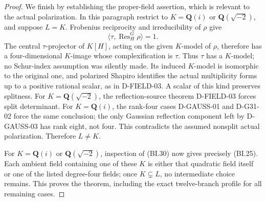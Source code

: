 \begin{proof}
We finish by establishing the proper-field assertion, which is
relevant to the actual polarization.  In this paragraph restrict
to $K=\mathbf Q(i)$ or $\mathbf Q(\sqrt{-2})$, and suppose $L=K$.
Frobenius reciprocity and irreducibility of $\rho$ give
\[
           \langle\tau,\operatorname{Res}_H^G\rho\rangle=1.
\]
The central $\tau$-projector of $K[H]$, acting on the given
$K$-model of $\rho$, therefore has a four-dimensional $K$-image
whose complexification is $\tau$.  Thus $\tau$ has a $K$-model;
no Schur-index assumption was silently made.  Its induced $K$-model
is isomorphic to the original one, and polarized Shapiro identifies
the actual multiplicity forms up to a positive rational scalar,
as in D-FIELD-03.  A scalar of this kind preserves splitness.
For $K=\mathbf Q(\sqrt{-2})$, the reflection-source theorem
D-FIELD-03 forces split determinant.  For $K=\mathbf Q(i)$,
the rank-four cases D-GAUSS-01 and D-G31-02 force the same
conclusion; the only Gaussian reflection component left by
D-GAUSS-03 has rank eight, not four.  This contradicts the
assumed nonsplit actual polarization.  Therefore $L\ne K$.

For $K=\mathbf Q(i)$ or $\mathbf Q(\sqrt{-2})$, inspection of
(BI.30) now gives precisely (BI.25).  Each ambient field containing
one of these $K$ is either that quadratic field itself or one of
the listed degree-four fields; once $K\subsetneq L$, no intermediate
choice remains.  This proves the theorem, including the exact
twelve-branch profile for all remaining cases.
\end{proof}
